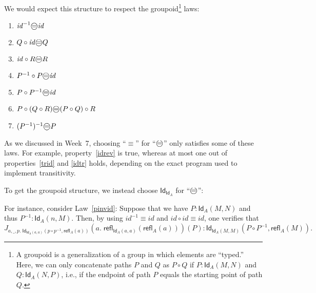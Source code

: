 \documentclass{article} \usepackage{chtt-notes} \usepackage{stmaryrd}
\newcommand{\circled}[1]{\text{\textcircled{#1}}}
\begin{document}
We would expect this structure to respect the groupoid\footnote{A groupoid is a generalization of a group in which elements are ``typed.'' Here, we can only concatenate paths $P$ and $Q$ as $P \circ Q$ if $P : \textsf{Id}_A(M, N)$ and $Q : \textsf{Id}_A(N, P)$, i.e., if the endpoint of path $P$ equals the starting point of path $Q$.} laws:
\begin{enumerate}
    \item \label{idrev} $\mathit{id}^{-1} \circled{=} \mathit{id}$
    \item \label{trid} $Q \circ \mathit{id} \circled{=} Q$
    \item \label{idtr} $\mathit{id} \circ R \circled{=} R$
    \item $P^{-1} \circ P \circled{=} \mathit{id}$
    \item \label{pinvid} $P \circ P^{-1} \circled{=} \mathit{id}$
    \item \label{assoc} $P \circ (Q \circ R) \circled{=} (P \circ Q) \circ R$
    \item $(P^{-1})^{-1} \circled{=} P$
\end{enumerate}
As we discussed in Week~7, choosing ``$\equiv$'' for ``$\circled{=}$'' only satisfies some of these laws.
For example, property~\ref{idrev} is true, whereas at most one out of properties~\ref{trid} and \ref{idtr} holds, depending on the exact program used to implement transitivity.

To get the groupoid structure, we instead choose $\textsf{Id}_{\textsf{Id}_A}$ for ``$\circled{=}$'':

For instance, consider Law~\ref{pinvid}:
Suppose that we have $P : \textsf{Id}_A(M, N)$ and thus $P^{-1} : \textsf{Id}_A(n, M)$.
Then, by using $\mathit{id}^{-1} \equiv \mathit{id}$ and $\mathit{id} \circ \mathit{id} \equiv \mathit{id}$, one verifies that
\[J_{a,\_,p.\; \textsf{Id}_{\textsf{Id}_A(a,a)}(p \circ p^{-1}, \textsf{refl}_A(a))}(a.\; \textsf{refl}_{\textsf{Id}_A(a,a)}(\textsf{refl}_A(a)))(P) : \textsf{Id}_{\textsf{Id}_A(M, M)}(P \circ P^{-1}, \textsf{refl}_A(M)).\]
\end{document}
